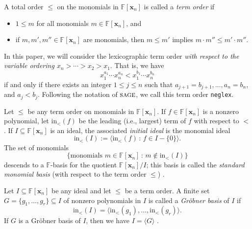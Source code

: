 \documentclass[ALCO,ThmDefs,published]{cedram}
\newcommand{\xx}{{\mathbf {x}}}
\newcommand{\FF}{{\mathbb{F}}}
\theoremstyle{plain}
\newcommand{\init}{{\mathrm {in}}}
\newcommand{\FF}{{\mathbb{F}}}
\newcommand{\xx}{{\mathbf {x}}}
\begin{document}
A total order $\leq$ on the monomials in $\FF[\xx_n]$ is called a \emph{term order} if 
\begin{itemize}
\item $1 \leq m$ for all monomials $m \in \FF[\xx_n]$, and
\item  if $m, m', m'' \in \FF[\xx_n]$ are monomials, then $m \leq m'$ implies $m \cdot m'' \leq m' \cdot m''$.
\end{itemize}
In this paper, we will consider the lexicographic term order \emph{with respect to the variable ordering
$x_n > \cdots > x_2 > x_1$}.  That is, we have
\begin{equation*}
x_1^{a_1} \cdots x_n^{a_n} < x_1^{b_1}  \cdots x_n^{b_n}
\end{equation*}
if and only if there exists an integer $1 \leq  j \leq n$ such that $a_{j+1} = b_{j+1}, \dots, a_n = b_n$, and
$a_j < b_j$.
Following the notation of $\textsc{sage}$,
we call this term order {\tt neglex}.

Let $\leq$ be any term order on monomials in $\FF[\xx_n]$.  If $f \in \FF[\xx_n]$ is a nonzero polynomial,
let $\init_<(f)$ be the leading (i.e., largest) term of $f$ with respect to $<$.  If $I \subseteq \FF[\xx_n]$ is an ideal, the 
associated \emph{initial ideal} is the monomial ideal
\begin{equation}
\init_<(I) := \langle \init_<(f) \,:\, f \in I - \{0\} \rangle.
\end{equation}
The set of monomials
\begin{equation}
\{ \text{monomials $m \in \FF[\xx_n]$} \,:\, m \notin \init_<(I) \}
\end{equation}
descends to a $\FF$-basis for the quotient  ${\FF[\xx_n]} / {I}$; this basis is called the 
\emph{standard monomial basis} (with respect to the term order $\leq$) \cite[Prop. 1, p. 230]{CLO}.

Let $I \subseteq \FF[\xx_n]$ be any ideal and let $\leq$ be a term order. 
A finite set $G = \{g_1, \dots, g_r\} \subseteq I$ 
of nonzero polynomials in $I$ is called a \emph{Gr\"obner basis} of $I$ if
\begin{equation}
\init_<(I) = \langle \init_<(g_1), \dots , \init_<(g_r) \rangle.
\end{equation}
If $G$ is a Gr\"obner basis of $I$, then we have $I = \langle G \rangle$ \cite[Cor. 6, p. 77]{CLO}.
\end{document}
